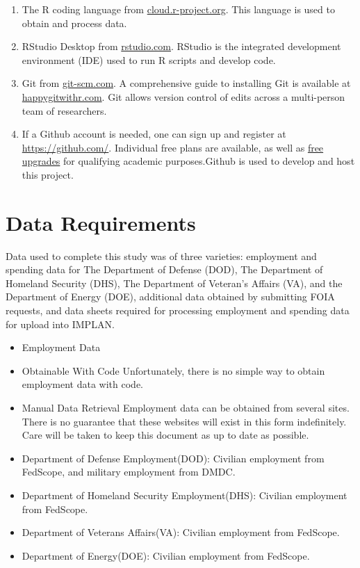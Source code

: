 \documentclass[
]{book}
\begin{document}
\begin{enumerate}
\def\labelenumi{\arabic{enumi}.}
\item
  The R coding language from \href{https://cloud.r-project.org/}{cloud.r-project.org}. This language is used to obtain and process data.
\item
  RStudio Desktop from \href{https://rstudio.com/products/rstudio/download/\#download}{rstudio.com}. RStudio is the integrated development environment (IDE) used to run R scripts and develop code.
\item
  Git from \href{https://git-scm.com/downloads}{git-scm.com}. A comprehensive guide to installing Git is available at \href{https://happygitwithr.com/install-git.html}{happygitwithr.com}. Git allows version control of edits across a multi-person team of researchers.
\item
  If a Github account is needed, one can sign up and register at \url{https://github.com/}. Individual free plans are available, as well as \href{https://help.github.com/en/articles/applying-for-an-educator-or-researcher-discount}{free upgrades} for qualifying academic purposes.Github is used to develop and host this project.
\end{enumerate}

\hypertarget{data-requirements}{%
\section{Data Requirements}\label{data-requirements}}

Data used to complete this study was of three varieties: employment and spending data for The Department of Defense (DOD), The Department of Homeland Security (DHS), The Department of Veteran's Affairs (VA), and the Department of Energy (DOE), additional data obtained by submitting FOIA requests, and data sheets required for processing employment and spending data for upload into IMPLAN.

\begin{itemize}
\item
  Employment Data
\item
  Obtainable With Code
  Unfortunately, there is no simple way to obtain employment data with code.
\item
  Manual Data Retrieval
  Employment data can be obtained from several sites. There is no guarantee that these websites will exist in this form indefinitely. Care will be taken to keep this document as up to date as possible.
\item
  Department of Defense Employment(DOD): Civilian employment from FedScope, and military employment from DMDC.
\item
  Department of Homeland Security Employment(DHS): Civilian employment from FedScope.
\item
  Department of Veterans Affairs(VA): Civilian employment from FedScope.
\item
  Department of Energy(DOE): Civilian employment from FedScope.
\end{itemize}
\end{document}
